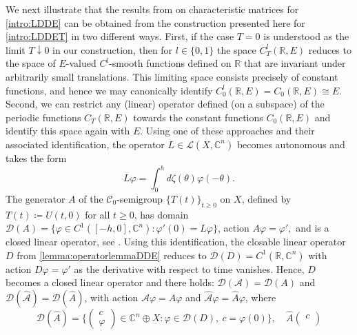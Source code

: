\documentclass[english]{myarticle}
\begin{document}
\begin{sloppypar}
\begin{remark} \label{remark:autonomousDDE}
We next illustrate that the results from \cite[Section II.1.1]{Kaashoek1992} on characteristic matrices for \eqref{intro:LDDE} can be obtained from the construction presented here for \eqref{intro:LDDET} in two different ways. First, if the case $T=0$ is understood as the limit $T \downarrow 0$ in our construction, then for $l \in \{0,1\}$ the space $C_T^l(\mathbb{R},E)$ reduces to the space of $E$-valued $C^l$-smooth functions defined on $\mathbb{R}$ that are invariant under arbitrarily small translations. This limiting space consists precisely of constant functions, and hence we may canonically identify $C_0^l(\mathbb{R},E) = C_0(\mathbb{R},E) \cong E$. Second, we can restrict any (linear) operator defined (on a subspace) of the periodic functions $C_T(\mathbb{R},E)$ towards the constant functions $C_0(\mathbb{R},E)$ and identify this space again with $E$. Using one of these approaches and their associated identification, the operator $L \in \mathcal{L}(X,\mathbb{C}^n)$ becomes autonomous and takes the form
\begin{equation*}
    L\varphi = \int_0^h d\zeta(\theta)\varphi(-\theta).
\end{equation*}
The generator $A$ of the $\mathcal{C}_0$-semigroup $\{T(t)\}_{t \geq 0}$ on $X$, defined by $T(t) \coloneqq U(t,0)$ for all $t \geq 0$, has domain $\mathcal{D}(A) = \{ \varphi \in C^1([-h,0],\mathbb{C}^n) :  \varphi'(0) = L \varphi \}$, action $A \varphi = \varphi',$ and is a closed linear operator, see \cite[Theorem I.1.4]{Engel2000}. Using this identification, the closable linear operator $D$ from \cref{lemma:operatorlemmaDDE} reduces to $\mathcal{D}(D) = C^1(\mathbb{R},\mathbb{C}^n)$ with action $D\varphi = \varphi'$ as the derivative with respect to time vanishes. Hence, $D$ becomes a closed linear operator and there holds: $\mathcal{D}(\mathcal{A}) = \mathcal{D}(A)$ and $ \mathcal{D}(\hat{\mathcal{A}}) = \mathcal{D}(\hat{A})$, with action $\mathcal{A} \varphi = A \varphi$ and $ \hat{\mathcal{A}} \varphi = \hat{A} \varphi$, where
\begin{equation*}
        \mathcal{D}(\hat{A})  = \bigg \{
    \begin{pmatrix}
        c \\
        \varphi
    \end{pmatrix}
    \in \mathbb{C}^n \oplus X : \varphi \in \mathcal{D}(D), \ c = \varphi(0) \bigg \}, \quad \hat{A} 
    \begin{pmatrix}
        c \\

\end{pmatrix}
\end{equation*}
\end{remark}
\end{sloppypar}
\end{document}

